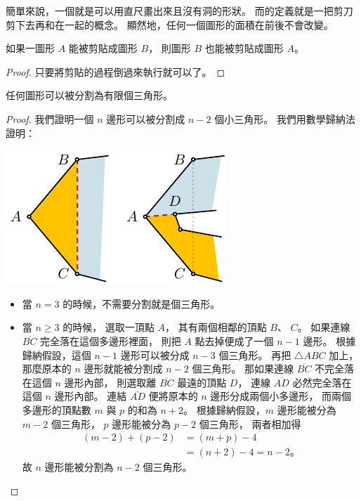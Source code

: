 \documentclass{article}
\begin{document}
\begin{multicols}{2}
\begin{remark}
	簡單來說，一個就是可以用直尺畫出來且沒有洞的形狀。
	而的定義就是一把剪刀剪下去再和在一起的概念。
	顯然地，任何一個圖形的面積在前後不會改變。
\end{remark}

\begin{theorem}\label{thm:reversible}
	如果一圖形 $A$ 能被剪貼成圖形 $B$，
	則圖形 $B$ 也能被剪貼成圖形 $A$。
\end{theorem}
\begin{proof}
	只要將剪貼的過程倒過來執行就可以了。
\end{proof}

\begin{theorem}\label{thm:triangulate}
	任何圖形可以被分割為有限個三角形。
\end{theorem}
\begin{proof}
	我們證明一個 $n$ 邊形可以被分割成 $n-2$ 個小三角形。
	我們用數學歸納法證明：
	\begin{center}
		\includegraphics[scale=1]{figures/figure-triangulate.pdf}
	\end{center}
	\begin{itemize}
		\item[\underdot{起始}]
			當 $n=3$ 的時候，不需要分割就是個三角形。
		\item[\underdot{推遞}]
			當 $n\geq3$ 的時候，
			選取一頂點 $A$，
			其有兩個相鄰的頂點 $B$、 $C$。
			如果連線 $\overline{BC}$ 完全落在這個多邊形裡面，
			則把 $A$ 點去掉便成了一個 $n-1$ 邊形。
			根據歸納假設，這個 $n-1$ 邊形可以被分成 $n-3$ 個三角形。
			再把 $\triangle{ABC}$ 加上，那麼原本的 $n$ 邊形就能被分割成 $n-2$ 個三角形。
			那如果連線 $\overline{BC}$ 不完全落在這個 $n$ 邊形內部，
			則選取離 $\overline{BC}$ 最遠的頂點 $D$，
			連線 $\overline{AD}$ 必然完全落在這個 $n$ 邊形內部。
			連結 $\overline{AD}$ 便將原本的 $n$ 邊形分成兩個小多邊形，
			而兩個多邊形的頂點數 $m$ 與 $p$ 的和為 $n+2$。
			根據歸納假設，$m$ 邊形能被分為 $m-2$ 個三角形，
			$p$ 邊形能被分為 $p-2$ 個三角形，
			兩者相加得
			\begin{align*}
				(m-2) + (p-2)
				&= (m+p) -4 \\
				&= (n+2) -4
				= n-2。
			\end{align*}
			故 $n$ 邊形能被分割為 $n-2$ 個三角形。
			\qedhere
	\end{itemize}
\end{proof}


\end{multicols}
\end{document}
